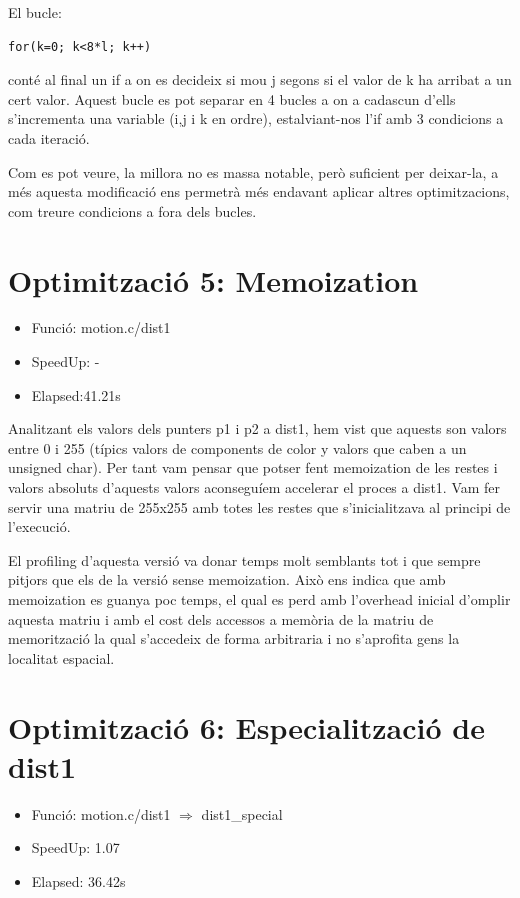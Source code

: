 El bucle:

\begin{lstlisting}
for(k=0; k<8*l; k++)
\end{lstlisting}

conté al final un if a on es decideix si mou j segons si el valor de k ha arribat a un cert valor. Aquest bucle es pot separar en 4 bucles a on a cadascun d'ells s'incrementa una variable (i,j i k en ordre), estalviant-nos l'if amb 3 condicions a cada iteració.

Com es pot veure, la millora no es massa notable, però suficient per deixar-la, a més aquesta modificació ens permetrà més endavant aplicar altres optimitzacions, com treure condicions a fora dels bucles.

\section{Optimitzaci\'o 5: Memoization}
\begin{itemize}
\item{Funció: motion.c/dist1}
\item{SpeedUp: -}
\item{Elapsed:41.21s} 
\end{itemize}

Analitzant els valors dels punters p1 i p2 a dist1, hem vist que aquests son valors entre 0 i 255  (típics valors de components de color y valors que caben a un unsigned char). Per tant vam pensar que potser fent memoization de les restes i valors absoluts d'aquests valors aconseguíem accelerar el proces a dist1. Vam fer servir una matriu de 255x255 amb totes les restes que s'inicialitzava al principi de l'execució. 

El profiling d'aquesta versió va donar temps molt semblants tot i que sempre pitjors que els de la versió sense memoization. Això ens indica que amb memoization es guanya poc temps, el qual es perd amb l'overhead inicial d'omplir aquesta matriu i amb el cost dels accessos a memòria de la matriu de memorització la qual s'accedeix de forma arbitraria i no s'aprofita gens la localitat espacial.

\section{Optimitzaci\'o 6: Especialitzaci\'o de dist1}
\begin{itemize}
\item{Funció: motion.c/dist1 $\Rightarrow$ dist1\_special}
\item{SpeedUp: 1.07}
\item{Elapsed: 36.42s}
\end{itemize}

